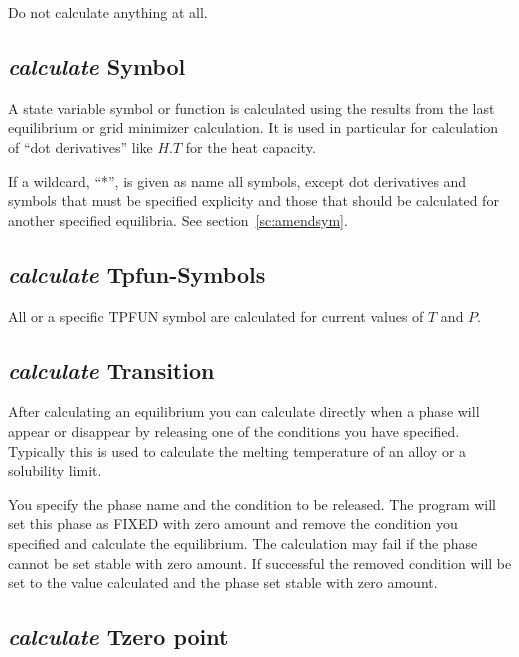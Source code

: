 \documentclass[11pt]{article}
\begin{document}
Do not calculate anything at all.

\hypertarget{Calculate symbol}{}
\subsection{{\em calculate} Symbol}

A state variable symbol or function is calculated using the results
from the last equilibrium or grid minimizer calculation.  It is used
in particular for calculation of ``dot derivatives'' like $H.T$ for
the heat capacity.

If a wildcard, ``*'', is given as name all symbols, except dot
derivatives and symbols that must be specified explicity and those
that should be calculated for another specified equilibria.  See
section~\ref{sc:amendsym}.


\hypertarget{Calculate TPfun}{}
\subsection{{\em calculate} Tpfun-Symbols}

All or a specific TPFUN symbol are calculated for current values of $T$
and $P$.

\hypertarget{Calculate transform}{}
\subsection{{\em calculate} Transition}

After calculating an equilibrium you can calculate directly when a
phase will appear or disappear by releasing one of the conditions you
have specified.  Typically this is used to calculate the melting
temperature of an alloy or a solubility limit.  

You specify the phase name and the condition to be released.  The
program will set this phase as FIXED with zero amount and remove the
condition you specified and calculate the equilibrium.  The
calculation may fail if the phase cannot be set stable with zero
amount.  If successful the removed condition will be set to the value
calculated and the phase set stable with zero amount.

\hypertarget{Tzero}{}
\subsection{{\em calculate} Tzero point}\label{sc:tzero2}
\end{document}
